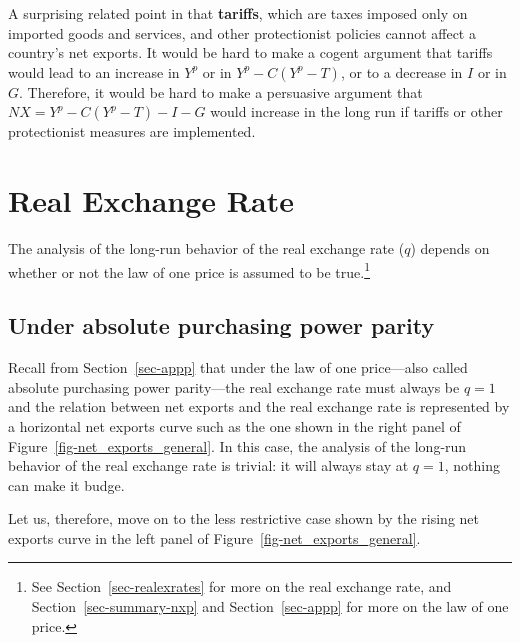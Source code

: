 \documentclass[
  letterpaper,
]{book}
\theoremstyle{plain}
\theoremstyle{remark}
\begin{document}
A surprising related point in that \textbf{tariffs}, which are taxes
imposed only on imported goods and services, and other protectionist
policies cannot affect a country's net exports. It would
be hard to make a cogent argument that tariffs would lead to an increase
in \(Y^p\) or in \(Y^p-C(Y^p-T)\), or to a decrease in \(I\) or in
\(G\). Therefore, it would be hard to make a persuasive argument that
\(NX=Y^p-C(Y^p-T)-I-G\) would increase in the long run if tariffs or
other protectionist measures are implemented.

\section{Real Exchange Rate}\label{sec-longq}

The analysis of the long-run behavior of the real exchange rate (\(q\))
depends on whether or not the law of one price is assumed to be
true.\footnote{See Section~\ref{sec-realexrates} for more on the real
  exchange rate, and Section~\ref{sec-summary-nxp} and
  Section~\ref{sec-appp} for more on the law of one price.}

\subsection{Under absolute purchasing power
parity}\label{sec-q-long-appp}


Recall from Section~\ref{sec-appp} that under the law of one
price---also called absolute purchasing power parity---the real exchange
rate must always be \(q=1\) and the relation between net exports and the
real exchange rate is represented by a horizontal net exports curve such
as the one shown in the right panel of
Figure~\ref{fig-net_exports_general}. In this case, the analysis of the
long-run behavior of the real exchange rate is trivial: it will always
stay at \(q=1\), nothing can make it budge.

Let us, therefore, move on to the less restrictive case shown by the
rising net exports curve in the left panel of
Figure~\ref{fig-net_exports_general}.
\end{document}
